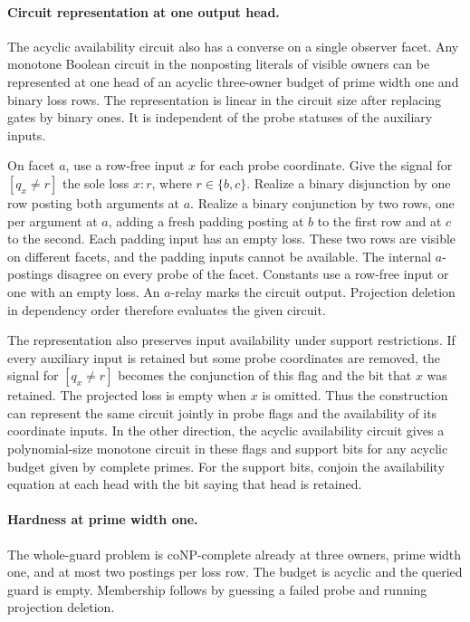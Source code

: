 \paragraph{Circuit representation at one output head.}
The acyclic availability circuit also has a
converse on a single observer facet. Any
monotone Boolean circuit in the nonposting
literals of visible owners can be represented
at one head of an acyclic three-owner budget
of prime width one and binary loss rows.
The representation is linear in the circuit
size after replacing gates by binary ones.
It is independent of the probe statuses of
the auxiliary inputs.

On facet $a$, use a row-free input $x$ for
each probe coordinate. Give the signal for
$[q_x\ne r]$ the sole loss $x:r$, where
$r\in\{b,c\}$. Realize a binary disjunction
by one row posting both arguments at $a$.
Realize a binary conjunction by two rows,
one per argument at $a$, adding a fresh
padding posting at $b$ to the first row
and at $c$ to the second. Each padding
input has an empty loss. These two rows
are visible on different facets, and the
padding inputs cannot be available. The
internal $a$-postings disagree on every
probe of the facet. Constants use a
row-free input or one with an empty loss.
An $a$-relay marks the circuit output.
Projection deletion in dependency order
therefore evaluates the given circuit.

The representation also preserves input
availability under support restrictions.
If every auxiliary input is retained but
some probe coordinates are removed, the
signal for $[q_x\ne r]$ becomes the
conjunction of this flag and the bit that
$x$ was retained. The projected loss is
empty when $x$ is omitted. Thus the
construction can represent the same circuit
jointly in probe flags and the availability
of its coordinate inputs. In the other
direction, the acyclic availability circuit
gives a polynomial-size monotone circuit
in these flags and support bits for any
acyclic budget given by complete primes.
For the support bits, conjoin the
availability equation at each head with
the bit saying that head is retained.

\paragraph{Hardness at prime width one.}
The whole-guard problem is
coNP-complete already at three owners, prime
width one, and at most two postings per loss
row. The budget is acyclic and the queried
guard is empty. Membership follows by guessing
a failed probe and running projection deletion.

